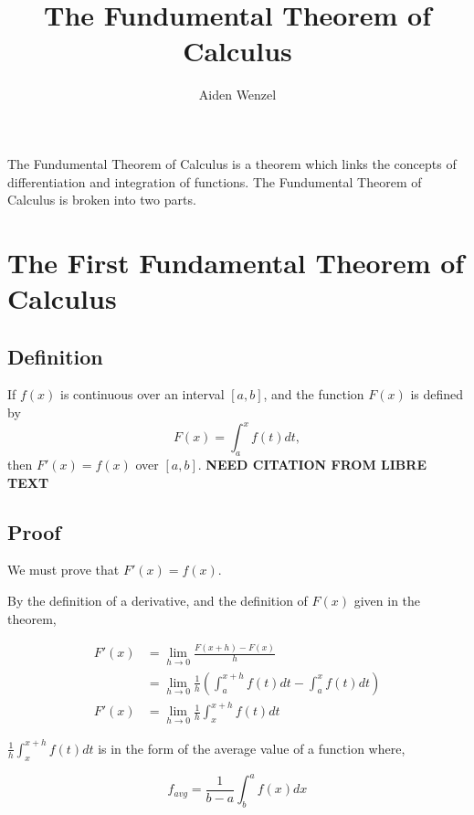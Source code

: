 \documentclass{article}
\title{The Fundumental Theorem of Calculus}
\author{Aiden Wenzel}
\begin{document}
\maketitle 

The Fundumental Theorem of Calculus is a theorem which links the concepts of differentiation and integration of functions. 
The Fundumental Theorem of Calculus is broken into two parts. 

\section{The First Fundamental Theorem of Calculus}
\subsection{Definition}
If $f(x)$ is continuous over an interval $[a,b]$, and the function $F(x)$ is defined by 
\[F(x) = \int_a^x f(t)dt,\]
then $F'(x) = f(x)$ over $[a,b]$. \textbf{NEED CITATION FROM LIBRE TEXT}

\subsection{Proof}
We must prove that \(F'(x) = f(x)\). 

By the definition of a derivative, and the definition of \(F(x)\) given in the theorem,

\begin{equation}
\begin{split}
    F'(x) &= \lim_{h \to 0}{\frac{F(x+h)-F(x)}{h}} \\
          &= \lim_{h \to 0}{\frac{1}{h} (\int_a^{x+h} f(t)dt - \int_a^x f(t)dt)} \\
    F'(x) &= \lim_{h \to 0}{\frac{1}{h} \int_x^{x+h} f(t)dt}
\end{split}
\end{equation}

\(\frac{1}{h} \int_x^{x+h} f(t)dt\) is in the form of the average value of a function where,

\[f_{avg} = \frac{1}{b-a} \int_b^a f(x)dx\]
\end{document}
